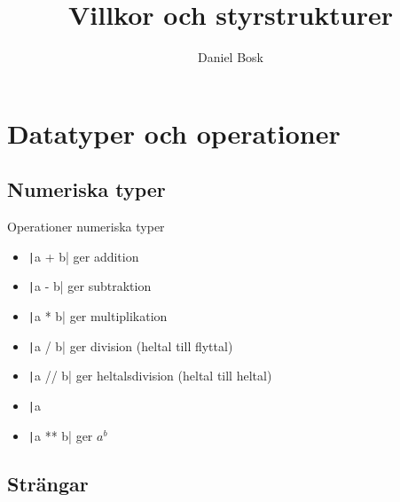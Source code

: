 \title{%
  Villkor och styrstrukturer
}
\author{Daniel Bosk}


\mode*

\begin{abstract}
  
\end{abstract}


\section{Datatyper och operationer}

\subsection{Numeriska typer}

\begin{frame}[fragile]
  \begin{block}{Operationer numeriska typer}
    \begin{itemize}
      \item \texttt|a + b| ger addition
      \item \texttt|a - b| ger subtraktion
      \item \texttt|a * b| ger multiplikation
      \item \texttt|a / b| ger division (heltal till flyttal)
      \item \texttt|a // b| ger heltalsdivision (heltal till heltal)
      \item \texttt|a %
      \item \texttt|a ** b| ger \(a^b\)
    \end{itemize}
  \end{block}
\end{frame}

\subsection{Strängar}

